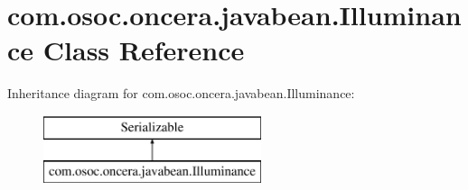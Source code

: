 \hypertarget{classcom_1_1osoc_1_1oncera_1_1javabean_1_1_illuminance}{}\section{com.\+osoc.\+oncera.\+javabean.\+Illuminance Class Reference}
\label{classcom_1_1osoc_1_1oncera_1_1javabean_1_1_illuminance}
Inheritance diagram for com.\+osoc.\+oncera.\+javabean.\+Illuminance\+:\begin{figure}[H]
\begin{center}
\leavevmode
\includegraphics[height=2.000000cm]{classcom_1_1osoc_1_1oncera_1_1javabean_1_1_illuminance}
\end{center}
\end{figure}
